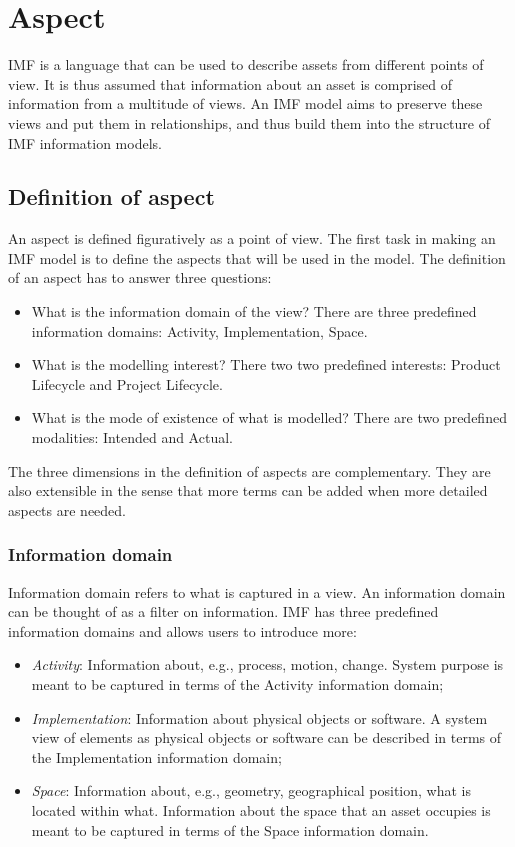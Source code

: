 \documentclass[../main.tex]{subfiles}
\begin{document}
\section{Aspect}
\label{sec:fundamentals_aspect}

IMF is  a language that can be used to describe assets from different points of view.  It is thus assumed that information about an asset is comprised of information from a multitude of views.  An IMF model aims to preserve these views and put them in relationships, and thus build them into the structure of IMF information models. 

\subsection{Definition of aspect}
An aspect is defined figuratively as a point of view.  The first task in making an IMF model is to define the aspects that will be used in the model. The definition of an aspect has to answer three questions:
\begin{itemize}
    \item What is the  information domain of the view?  There are three predefined information domains: Activity, Implementation, Space. 
    \item What is the modelling interest? There two two predefined interests: Product Lifecycle  and Project Lifecycle. 
    \item What is the mode of existence of what is modelled? There are two predefined modalities: Intended and Actual. 
\end{itemize}

The three dimensions in the definition of aspects are complementary. They are also extensible in the sense that more terms can be added when more detailed aspects are needed. 

\subsubsection{Information domain}
Information domain refers to what is captured in a view.
An information domain can be thought of as a filter on information. 
IMF has three predefined information domains and allows users to introduce more:
\begin{itemize}
    \item \textit{Activity}: Information about, e.g., process, motion, change. System purpose is meant to be captured in  terms of the Activity information domain; 
    \item \textit{Implementation}: Information about physical objects or software. A system view of elements as physical objects or software can be described in terms of the Implementation information domain;
    \item \textit{Space}: Information about, e.g., geometry, geographical position, what is located within what. Information about the space that an asset occupies is meant to be captured in terms of the Space information domain.
\end{itemize}
\end{document}
